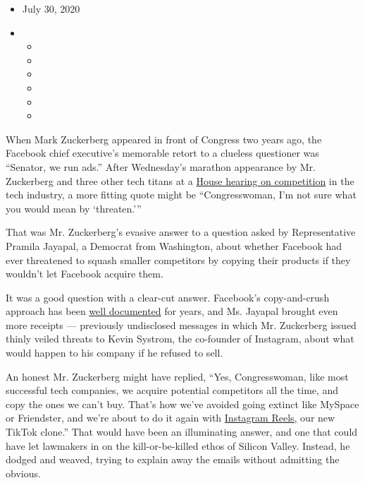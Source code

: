 \begin{itemize}
\item
  July 30, 2020
\item
  \begin{itemize}
  \item
  \item
  \item
  \item
  \item
  \item
  \end{itemize}
\end{itemize}

When Mark Zuckerberg appeared in front of Congress two years ago, the
Facebook chief executive's memorable retort to a clueless questioner was
``Senator, we run ads.'' After Wednesday's marathon appearance by Mr.
Zuckerberg and three other tech titans at a
\href{https://www.nytimes.com/2020/07/29/technology/big-tech-hearing-apple-amazon-facebook-google.html}{House
hearing on competition} in the tech industry, a more fitting quote might
be ``Congresswoman, I'm not sure what you would mean by `threaten.'''

That was Mr. Zuckerberg's evasive answer to a question asked by
Representative Pramila Jayapal, a Democrat from Washington, about
whether Facebook had ever threatened to squash smaller competitors by
copying their products if they wouldn't let Facebook acquire them.

It was a good question with a clear-cut answer. Facebook's
copy-and-crush approach has been
\href{https://www.wired.com/story/copycat-how-facebook-tried-to-squash-snapchat/}{well
documented} for years, and Ms. Jayapal brought even more receipts ---
previously undisclosed messages in which Mr. Zuckerberg issued thinly
veiled threats to Kevin Systrom, the co-founder of Instagram, about what
would happen to his company if he refused to sell.

An honest Mr. Zuckerberg might have replied, ``Yes, Congresswoman, like
most successful tech companies, we acquire potential competitors all the
time, and copy the ones we can't buy. That's how we've avoided going
extinct like MySpace or Friendster, and we're about to do it again with
\href{https://techcrunch.com/2020/07/16/instagram-confirms-its-tiktok-rival-reels-will-launch-in-the-us-in-early-august/}{Instagram
Reels,} our new TikTok clone.'' That would have been an illuminating
answer, and one that could have let lawmakers in on the
kill-or-be-killed ethos of Silicon Valley. Instead, he dodged and
weaved, trying to explain away the emails without admitting the obvious.

